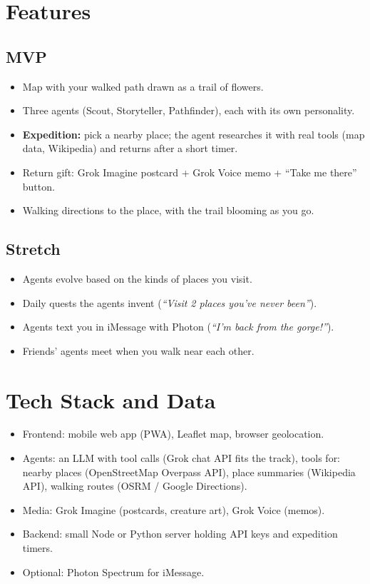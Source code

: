 \documentclass[11pt]{article}
\begin{document}
\section{Features}
\subsection{MVP}
\begin{itemize}
  \item Map with your walked path drawn as a trail of flowers.
  \item Three agents (Scout, Storyteller, Pathfinder), each with its own personality.
  \item \textbf{Expedition:} pick a nearby place; the agent researches it with real tools (map data, Wikipedia) and returns after a short timer.
  \item Return gift: Grok Imagine postcard + Grok Voice memo + ``Take me there'' button.
  \item Walking directions to the place, with the trail blooming as you go.
\end{itemize}
\subsection{Stretch}
\begin{itemize}
  \item Agents evolve based on the kinds of places you visit.
  \item Daily quests the agents invent (\emph{``Visit 2 places you've never been''}).
  \item Agents text you in iMessage with Photon (\emph{``I'm back from the gorge!''}).
  \item Friends' agents meet when you walk near each other.
\end{itemize}

\section{Tech Stack and Data}
\begin{itemize}
  \item Frontend: mobile web app (PWA), Leaflet map, browser geolocation.
  \item Agents: an LLM with tool calls (Grok chat API fits the track), tools for:
    nearby places (OpenStreetMap Overpass API), place summaries (Wikipedia API),
    walking routes (OSRM / Google Directions).
  \item Media: Grok Imagine (postcards, creature art), Grok Voice (memos).
  \item Backend: small Node or Python server holding API keys and expedition timers.
  \item Optional: Photon Spectrum for iMessage.
\end{itemize}
\end{document}
